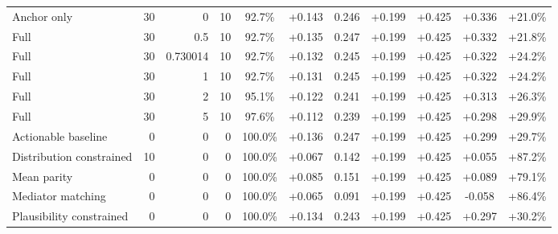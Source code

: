 \begin{table}[htbp]
\begin{tabular}{lrrrccccccc}
Anchor only & 30 & 0 & 10 & 92.7\% & +0.143 & 0.246 & +0.199 & +0.425 & +0.336 & +21.0\% \\
Full & 30 & 0.5 & 10 & 92.7\% & +0.135 & 0.247 & +0.199 & +0.425 & +0.332 & +21.8\% \\
Full & 30 & 0.730014 & 10 & 92.7\% & +0.132 & 0.245 & +0.199 & +0.425 & +0.322 & +24.2\% \\
Full & 30 & 1 & 10 & 92.7\% & +0.131 & 0.245 & +0.199 & +0.425 & +0.322 & +24.2\% \\
Full & 30 & 2 & 10 & 95.1\% & +0.122 & 0.241 & +0.199 & +0.425 & +0.313 & +26.3\% \\
Full & 30 & 5 & 10 & 97.6\% & +0.112 & 0.239 & +0.199 & +0.425 & +0.298 & +29.9\% \\
Actionable baseline & 0 & 0 & 0 & 100.0\% & +0.136 & 0.247 & +0.199 & +0.425 & +0.299 & +29.7\% \\
Distribution constrained & 10 & 0 & 0 & 100.0\% & +0.067 & 0.142 & +0.199 & +0.425 & +0.055 & +87.2\% \\
Mean parity & 0 & 0 & 0 & 100.0\% & +0.085 & 0.151 & +0.199 & +0.425 & +0.089 & +79.1\% \\
Mediator matching & 0 & 0 & 0 & 100.0\% & +0.065 & 0.091 & +0.199 & +0.425 & -0.058 & +86.4\% \\
Plausibility constrained & 0 & 0 & 0 & 100.0\% & +0.134 & 0.243 & +0.199 & +0.425 & +0.297 & +30.2\% \\
\bottomrule
\end{tabular}
\end{table}